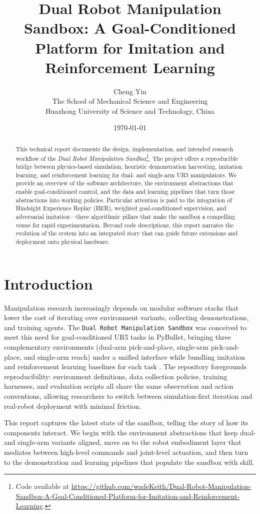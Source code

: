\documentclass[11pt]{article}
\title{Dual Robot Manipulation Sandbox: A Goal-Conditioned Platform for Imitation and Reinforcement Learning}
\author{Cheng Yin\\The School of Mechanical Science and Engineering\\Huazhong University of Science and Technology, China}
\date{\today}
\begin{document}
\maketitle
\begin{abstract}
This technical report documents the design, implementation, and intended research workflow of the \emph{Dual Robot Manipulation Sandbox}\footnote{Code available at \url{https://github.com/wadeKeith/Dual-Robot-Manipulation-Sandbox-A-Goal-Conditioned-Platform-for-Imitation-and-Reinforcement-Learning}.}. The project offers a reproducible bridge between physics-based simulation, heuristic demonstration harvesting, imitation learning, and reinforcement learning for dual- and single-arm UR5 manipulators. We provide an overview of the software architecture, the environment abstractions that enable goal-conditioned control, and the data and learning pipelines that turn those abstractions into working policies. Particular attention is paid to the integration of Hindsight Experience Replay (HER), weighted goal-conditioned supervision, and adversarial imitation---three algorithmic pillars that make the sandbox a compelling venue for rapid experimentation. Beyond code descriptions, this report narrates the evolution of the system into an integrated story that can guide future extensions and deployment onto physical hardware.
\end{abstract}

\section{Introduction}
Manipulation research increasingly depends on modular software stacks that lower the cost of iterating over environment variants, collecting demonstrations, and training agents. The \texttt{Dual Robot Manipulation Sandbox} was conceived to meet this need for goal-conditioned UR5 tasks in PyBullet, bringing three complementary environments (dual-arm pick-and-place, single-arm pick-and-place, and single-arm reach) under a unified interface while bundling imitation and reinforcement learning baselines for each task \cite{repoOverview}. The repository foregrounds reproducibility: environment definitions, data collection policies, training harnesses, and evaluation scripts all share the same observation and action conventions, allowing researchers to switch between simulation-first iteration and real-robot deployment with minimal friction.

This report captures the latest state of the sandbox, telling the story of how its components interact. We begin with the environment abstractions that keep dual- and single-arm variants aligned, move on to the robot embodiment layer that mediates between high-level commands and joint-level actuation, and then turn to the demonstration and learning pipelines that populate the sandbox with skill.
\end{document}
